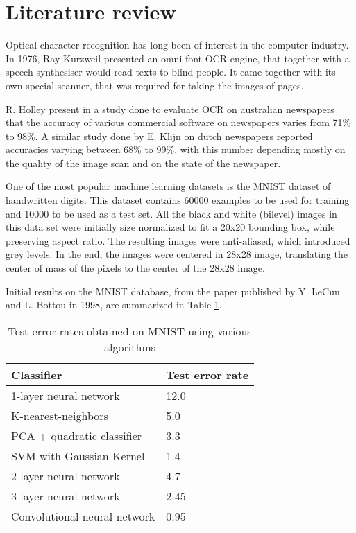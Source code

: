 \section{Literature review}
\label{sec:lit_rev}
Optical character recognition has long been of interest in the computer industry. In 1976, Ray Kurzweil presented an omni-font OCR engine, that together with a speech synthesiser would read texts to blind people. It came together with its own special scanner, that was required for taking the images of pages. \cite{schantz1982history}

R. Holley present in a study\cite{Holley_2009} done to evaluate OCR on australian newspapers that the accuracy of various commercial software on newspapers varies from 71\% to 98\%. A similar study done by E. Klijn on dutch newspapers reported accuracies varying between 68\% to 99\%, with this number depending mostly on the quality of the image scan and on the state of the newspaper. 

One of the most popular machine learning datasets is the MNIST dataset of handwritten digits\cite{lecun1998mnist}. This dataset contains 60000 examples to be used for training and 10000 to be used as a test set. All the black and white (bilevel) images in this data set were initially size normalized to fit a 20x20 bounding box, while preserving aspect ratio. The resulting images were anti-aliased, which introduced grey levels. In the end, the images were centered in 28x28 image, translating the center of mass of the pixels to the center of the 28x28 image. 

Initial results on the MNIST database, from the paper published by Y. LeCun and L. Bottou in 1998\cite{Lecun_1998}, are summarized in Table \ref{table:mnist_results}. 

\begin{table}[h]
\caption{Test error rates obtained on MNIST using various algorithms}
\label{table:mnist_results}
\begin{tabular}{ll}
\hline
Classifier                   & Test error rate \\ \hline
1-layer neural network       & 12.0            \\
K-nearest-neighbors          & 5.0             \\
PCA + quadratic classifier   & 3.3             \\
SVM with Gaussian Kernel     & 1.4             \\
2-layer neural network       & 4.7             \\
3-layer neural network       & 2.45            \\
Convolutional neural network & 0.95            \\ \hline
\end{tabular}
\end{table}

